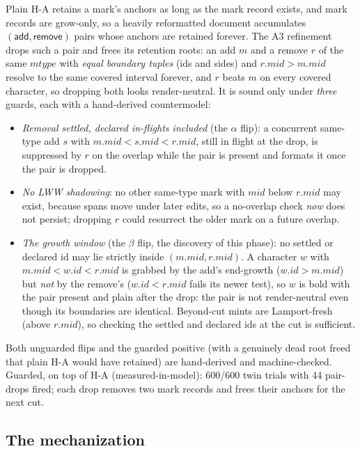 \documentclass[11pt]{article}
\begin{document}
Plain H-A retains a mark's anchors as long as the mark record exists,
and mark records are grow-only, so a heavily reformatted document
accumulates $(\mathsf{add}, \mathsf{remove})$ pairs whose anchors are
retained forever. The A3 refinement drops such a pair and frees its
retention roots: an add $m$ and a remove $r$ of the same
$\mathit{mtype}$ with \emph{equal boundary tuples} (ids and sides) and
$r.\mathit{mid} > m.\mathit{mid}$ resolve to the same covered interval
forever, and $r$ beats $m$ on every covered character, so dropping
both looks render-neutral. It is sound only under \emph{three} guards,
each with a hand-derived countermodel:
\begin{itemize}[leftmargin=2em]
\item \emph{Removal settled, declared in-flights included} (the
  $\alpha$ flip): a concurrent same-type add $s$ with $m.\mathit{mid}
  < s.\mathit{mid} < r.\mathit{mid}$, still in flight at the drop, is
  suppressed by $r$ on the overlap while the pair is present and
  formats it once the pair is dropped.
\item \emph{No LWW shadowing}: no other same-type mark with
  $\mathit{mid}$ below $r.\mathit{mid}$ may exist, because spans move
  under later edits, so a no-overlap check \emph{now} does not
  persist; dropping $r$ could resurrect the older mark on a future
  overlap.
\item \emph{The growth window} (the $\beta$ flip, the discovery of
  this phase): no settled or declared id may lie strictly inside
  $(m.\mathit{mid}, r.\mathit{mid})$. A character $w$ with
  $m.\mathit{mid} < w.\mathit{id} < r.\mathit{mid}$ is grabbed by the
  add's end-growth ($w.\mathit{id} > m.\mathit{mid}$) but \emph{not}
  by the remove's ($w.\mathit{id} < r.\mathit{mid}$ fails its newer
  test), so $w$ is bold with the pair present and plain after the
  drop: the pair is not render-neutral even though its boundaries are
  identical. Beyond-cut mints are Lamport-fresh (above
  $r.\mathit{mid}$), so checking the settled and declared ids at the
  cut is sufficient.
\end{itemize}
Both unguarded flips and the guarded positive (with a genuinely dead
root freed that plain H-A would have retained) are hand-derived and
machine-checked. Guarded, on top of H-A (measured-in-model): 600/600
twin trials with 44 pair-drops fired; each drop removes two mark
records and frees their anchors for the next cut.

\subsection{The mechanization}
\label{sec:marksmech}
\end{document}
